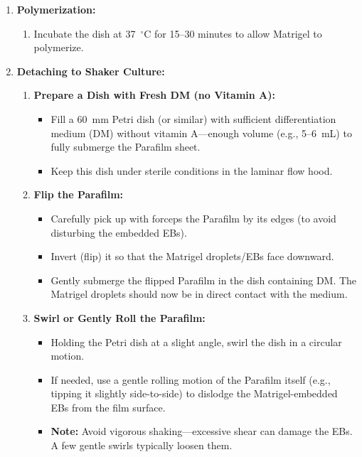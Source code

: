 \documentclass[11pt]{article}
\begin{document}
\begin{enumerate}[leftmargin=*]
    \item \textbf{Polymerization:}
    \begin{enumerate}[leftmargin=*]
        \item Incubate the dish at 37~$^\circ$C for 15–30 minutes to allow Matrigel to polymerize.
    \end{enumerate}
    \item \textbf{Detaching to Shaker Culture:}
    \begin{enumerate}[leftmargin=*]
        \item \textbf{Prepare a Dish with Fresh DM (no Vitamin A):}
        \begin{itemize}[leftmargin=*]
            \item Fill a 60~mm Petri dish (or similar) with sufficient differentiation medium (DM) without vitamin A—enough volume (e.g., 5–6~mL) to fully submerge the Parafilm sheet.
            \item Keep this dish under sterile conditions in the laminar flow hood.
        \end{itemize}
        
        \item \textbf{Flip the Parafilm:}
        \begin{itemize}[leftmargin=*]
            \item Carefully pick up with forceps the Parafilm by its edges (to avoid disturbing the embedded EBs).
            \item Invert (flip) it so that the Matrigel droplets/EBs face downward.
            \item Gently submerge the flipped Parafilm in the dish containing DM. The Matrigel droplets should now be in direct contact with the medium.
        \end{itemize}
        
        \item \textbf{Swirl or Gently Roll the Parafilm:}
        \begin{itemize}[leftmargin=*]
            \item Holding the Petri dish at a slight angle, swirl the dish in a circular motion.
            \item If needed, use a gentle rolling motion of the Parafilm itself (e.g., tipping it slightly side-to-side) to dislodge the Matrigel-embedded EBs from the film surface.
            \item \textbf{Note:} Avoid vigorous shaking—excessive shear can damage the EBs. A few gentle swirls typically loosen them.
        \end{itemize}


\end{enumerate}
\end{enumerate}
\end{document}
